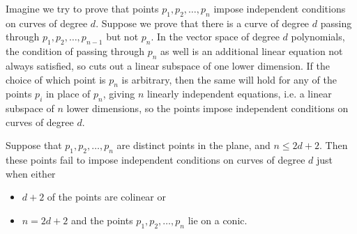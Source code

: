 Imagine we try to prove that points \(p_1,p_2,\dots,p_n\) impose independent conditions on curves of degree \(d\).
Suppose we prove that there is a curve of degree \(d\) passing through \(p_1,p_2,\dots,p_{n-1}\) but not \(p_n\).
In the vector space of degree \(d\) polynomials, the condition of passing through \(p_n\) as well is an additional linear equation not always satisfied, so cuts out a linear subspace of one lower dimension.
If the choice of which point is \(p_n\) is arbitrary, then the same will hold for any of the points \(p_i\) in place of \(p_n\), giving \(n\) linearly independent equations, i.e. a linear subspace of \(n\) lower dimensions, so the points impose independent conditions on curves of degree \(d\).
\begin{theorem}\label{theorem:independence}
Suppose that \(p_1,p_2,\dots,p_n\) are distinct points in the plane, and \(n \le 2d+2\).
Then these points fail to impose independent conditions on curves of degree \(d\) just when either 
\begin{itemize}
\item
\(d+2\) of the points are colinear or
\item
\(n=2d+2\) and the points \(p_1,p_2,\dots,p_n\) lie on a conic.
\end{itemize}
\end{theorem}
